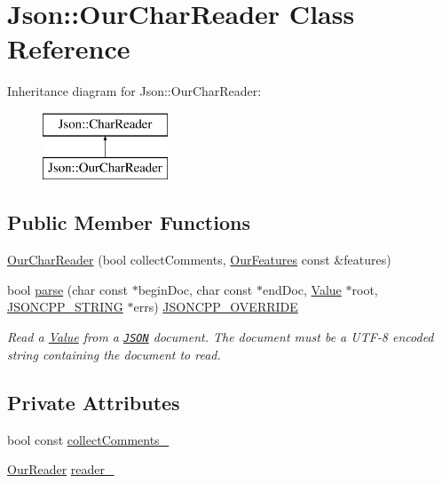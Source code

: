 \hypertarget{classJson_1_1OurCharReader}{}\section{Json\+:\+:Our\+Char\+Reader Class Reference}
\label{classJson_1_1OurCharReader}
Inheritance diagram for Json\+:\+:Our\+Char\+Reader\+:\begin{figure}[H]
\begin{center}
\leavevmode
\includegraphics[height=2.000000cm]{classJson_1_1OurCharReader}
\end{center}
\end{figure}
\subsection*{Public Member Functions}
\begin{DoxyCompactItemize}
\item 
\hyperlink{classJson_1_1OurCharReader_a5015506620e7ba7bab417756fa1ca9fe_a5015506620e7ba7bab417756fa1ca9fe}{Our\+Char\+Reader} (bool collect\+Comments, \hyperlink{classJson_1_1OurFeatures}{Our\+Features} const \&features)
\item 
bool \hyperlink{classJson_1_1OurCharReader_a547f08ec5a9951ca69e8bb2e90296c83_a547f08ec5a9951ca69e8bb2e90296c83}{parse} (char const $\ast$begin\+Doc, char const $\ast$end\+Doc, \hyperlink{classJson_1_1Value}{Value} $\ast$root, \hyperlink{json_8h_a1e723f95759de062585bc4a8fd3fa4be_a1e723f95759de062585bc4a8fd3fa4be}{J\+S\+O\+N\+C\+P\+P\+\_\+\+S\+T\+R\+I\+NG} $\ast$errs) \hyperlink{json_8h_a824d6199c91488107e443226fa6022c5_a824d6199c91488107e443226fa6022c5}{J\+S\+O\+N\+C\+P\+P\+\_\+\+O\+V\+E\+R\+R\+I\+DE}
\begin{DoxyCompactList}\small\item\em Read a \hyperlink{classJson_1_1Value}{Value} from a \href{http://www.json.org}{\tt J\+S\+ON} document. The document must be a U\+T\+F-\/8 encoded string containing the document to read. \end{DoxyCompactList}\end{DoxyCompactItemize}
\subsection*{Private Attributes}
\begin{DoxyCompactItemize}
\item 
bool const \hyperlink{classJson_1_1OurCharReader_aa6afd3d0f754cadad0f6d2be38bcfee0_aa6afd3d0f754cadad0f6d2be38bcfee0}{collect\+Comments\+\_\+}
\item 
\hyperlink{classJson_1_1OurReader}{Our\+Reader} \hyperlink{classJson_1_1OurCharReader_aedd4520b8570654ed7aa0726075ee58d_aedd4520b8570654ed7aa0726075ee58d}{reader\+\_\+}
\end{DoxyCompactItemize}


